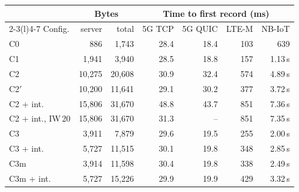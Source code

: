 \begin{tabular}{@{}lrrrrrr@{}}\toprule
 & \multicolumn{2}{c}{Bytes} & \multicolumn{4}{c}{Time to first record (ms)} \\ \cmidrule(lr){2-3}\cmidrule(l){4-7}
Config. & server & total & 5G TCP & 5G QUIC & LTE-M & NB-IoT \\ \midrule
C0 & 886 & 1,743 & 28.4 & 18.4 & 103 & 639 \\
C1 & 1,941 & 3,940 & 28.5 & 18.8 & 157 & 1.13\,s \\
C2 & 10,275 & 20,608 & 30.9 & 32.4 & 574 & 4.89\,s \\
C2$'$ & 10,200 & 11,641 & 29.1 & 30.2 & 377 & 3.72\,s \\
C2 + int. & 15,806 & 31,670 & 48.8 & 43.7 & 851 & 7.36\,s \\
C2 + int., IW\,20 & 15,806 & 31,670 & 31.3 & -- & 851 & 7.35\,s \\
C3 & 3,911 & 7,879 & 29.6 & 19.5 & 255 & 2.00\,s \\
C3 + int. & 5,727 & 11,515 & 30.1 & 19.8 & 348 & 2.85\,s \\
C3m & 3,914 & 11,598 & 30.4 & 19.8 & 338 & 2.49\,s \\
C3m + int. & 5,727 & 15,226 & 29.9 & 19.9 & 429 & 3.32\,s \\
\bottomrule\end{tabular}

